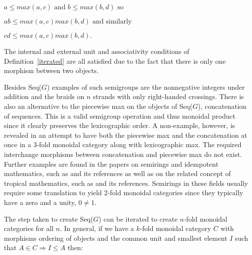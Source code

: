 \documentclass{tac}
\begin{document}
{\begin{enumerate}
 $
   a \le max(a,c) \text{ and } b \le max(b,d)  \text{ so } $
   
              $  ab \le max(a,c)max(b,d)   \text{ and similarly } $
                
              $  cd \le max(a,c)max(b,d).
$
 
 The internal and external unit and associativity conditions of Definition~\ref{iterated} are all satisfied due to the
 fact that there is only one morphism between two objects. 
 
 Besides Seq($G$) examples
 of such semigroups are the nonnegative integers under addition
 and the braids on $n$ strands with only right-handed crossings. There is also an alternative
 to the piecewise max on the objects of Seq($G$), concatenation of sequences. This is a valid semigroup
 operation and thus monoidal product since it clearly preserves the lexicographic order. A non-example,
 however, is revealed in an attempt to have both the piecewise max and the concatenation at once in
 a 3-fold monoidal category along with lexicographic max. The required interchange morphisms between
 concatenation and piecewise max do not exist. Further examples are found in the papers on
 semirings and idempotent mathematics, such as \cite{LitSob} and its references as well as on
 the related concept of tropical mathematics, such as \cite{Sturm} and its references. Semirings in these
 fields usually require some 
 translation to yield 2-fold monoidal categories since they typically have a zero and a unity, $0 \ne 1.$ 
 
 The step taken to create Seq($G$) can be iterated to create $n$-fold monoidal categories for all $n.$ 
 In general, if we have a $k$-fold monoidal category $C$ with morphisms ordering of objects and the
common unit and smallest element $I$ such that $A\in C \Rightarrow I\le A$ then:


\end{enumerate}}
\end{document}
